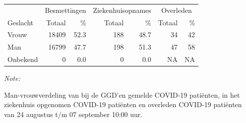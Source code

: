 \documentclass[
  english,
  man,floatsintext]{apa6}
\begin{document}
\begin{table}
\centering\begingroup\fontsize{11}{13}\selectfont

\begin{threeparttable}
\begin{tabular}{lrrrrrr}
\toprule
\multicolumn{1}{c}{ } & \multicolumn{2}{c}{Besmettingen} & \multicolumn{2}{c}{Ziekenhuisopnames} & \multicolumn{2}{c}{Overleden} \\
\cmidrule(l{3pt}r{3pt}){2-3} \cmidrule(l{3pt}r{3pt}){4-5} \cmidrule(l{3pt}r{3pt}){6-7}
Geslacht & Totaal & \% & Totaal & \% & Totaal & \%\\
\midrule
Vrouw & 18409 & 52.3 & 188 & 48.7 & 34 & 42\\
Man & 16799 & 47.7 & 198 & 51.3 & 47 & 58\\
Onbekend & 0 & 0.0 & 0 & 0.0 & NA & NA\\
\bottomrule
\end{tabular}
\begin{tablenotes}
\item \textit{Note: } 
\item Man-vrouwverdeling van bij de GGD’en gemelde COVID-19 patiënten, in het ziekenhuis opgenomen COVID-19 patiënten en overleden COVID-19 patiënten van 24 augustus t/m 07 september 10:00 uur.
\end{tablenotes}
\end{threeparttable}
\endgroup{}
\end{table}
\newpage
\end{document}
